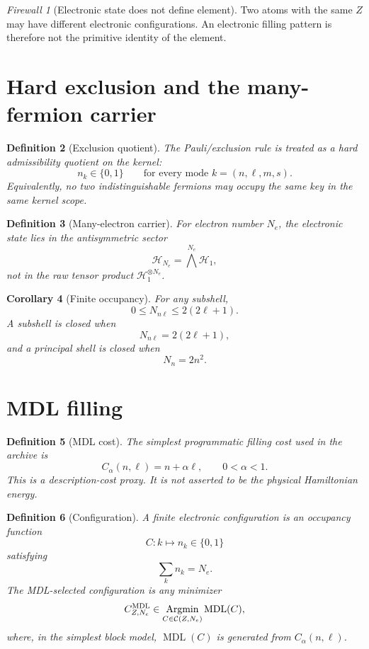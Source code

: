 \documentclass[11pt,a4paper]{article}
\newtheorem{definition}{Definition}[section]
\newtheorem{corollary}[definition]{Corollary}
\theoremstyle{remark}
\newtheorem{firewall}[definition]{Firewall}
\newcommand{\Hone}{\mathcal H_1}
\newcommand{\Cfg}{\mathcal C}
\newcommand{\MDL}{\operatorname{MDL}}
\newcommand{\Argmin}{\operatorname*{Argmin}}
\begin{document}
\begin{firewall}[Electronic state does not define element]
Two atoms with the same $Z$ may have different electronic configurations.  An
electronic filling pattern is therefore not the primitive identity of the
element.
\end{firewall}

\section{Hard exclusion and the many-fermion carrier}

\begin{definition}[Exclusion quotient]
The Pauli/exclusion rule is treated as a hard admissibility quotient on the
kernel:
\[
 n_k\in\{0,1\}\qquad\text{for every mode }k=(n,\ell,m,s).
\]
Equivalently, no two indistinguishable fermions may occupy the same key in the
same kernel scope.
\end{definition}

\begin{definition}[Many-electron carrier]
For electron number $N_e$, the electronic state lies in the antisymmetric sector
\[
 \mathcal H_{N_e}=\bigwedge^{N_e}\Hone,
\]
not in the raw tensor product $\Hone^{\otimes N_e}$.
\end{definition}

\begin{corollary}[Finite occupancy]
For any subshell,
\[
 0\le N_{n\ell}\le 2(2\ell+1).
\]
A subshell is closed when
\[
 N_{n\ell}=2(2\ell+1),
\]
and a principal shell is closed when
\[
 N_n=2n^2.
\]
\end{corollary}

\section{MDL filling}

\begin{definition}[MDL cost]
The simplest programmatic filling cost used in the archive is
\[
 C_{\alpha}(n,\ell)=n+\alpha\ell,
 \qquad 0<\alpha<1.
\]
This is a description-cost proxy.  It is not asserted to be the physical
Hamiltonian energy.
\end{definition}

\begin{definition}[Configuration]
A finite electronic configuration is an occupancy function
\[
 C:k\longmapsto n_k\in\{0,1\}
\]
satisfying
\[
 \sum_k n_k=N_e.
\]
The MDL-selected configuration is any minimizer
\[
 C^{\rm MDL}_{Z,N_e}\in
 \Argmin_{C\in\Cfg(Z,N_e)} \MDL(C),
\]
where, in the simplest block model, $\MDL(C)$ is generated from
$C_{\alpha}(n,\ell)$.
\end{definition}
\end{document}
